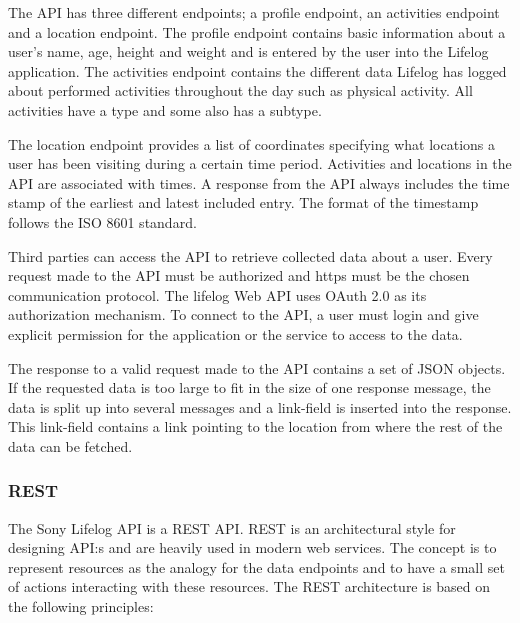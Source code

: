 \documentclass{cslthse-msc}
\begin{document}
The API has three different endpoints; a profile endpoint, an activities endpoint and a location endpoint. The profile endpoint contains basic information about a user's name, age, height and weight and is entered by the user into the Lifelog application. The activities endpoint contains the different data Lifelog has logged about performed activities throughout the day such as physical activity. All activities have a type and some also has a subtype. 

The location endpoint provides a list of coordinates specifying what locations a user has been visiting during a certain time period. Activities and locations in the API are associated with times. A response from the API always includes the time stamp of the earliest and latest included entry. The format of the timestamp follows the ISO 8601 standard. 

Third parties can access the API to retrieve collected data about a user. Every request made to the API must be authorized and https must be the chosen communication protocol. The lifelog Web API uses OAuth 2.0 as its authorization mechanism. To connect to the API, a user must login and give explicit permission for the application or the service to access to the data. 

The response to a valid request made to the API contains a set of JSON objects. If the requested data is too large to fit in the size of one response message, the data is split up into several messages and a link-field is inserted into the response. This link-field contains a link pointing to the location from where the rest of the data can be fetched. 


\subsubsection{REST}
\label{sec:rest}

The Sony Lifelog API is a REST API. REST is an architectural style for designing API:s and are heavily used in modern web services. The concept is to represent resources as the analogy for the data endpoints and to have a small set of actions interacting with these resources. The REST architecture is based on the following principles\cite{pautasso2014restful}:
\end{document}
